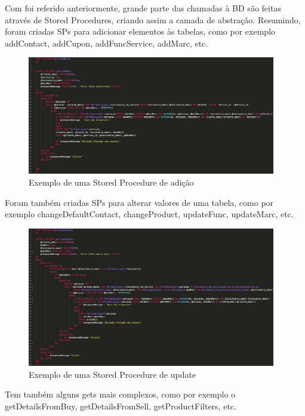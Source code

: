 \documentclass[10pt,portuguese]{article}
\begin{document}
\par Com foi referido anteriormente, grande parte das chamadas à BD são feitas através de Stored Procedures, criando assim a camada de abstração. Resumindo, foram criadas SPs para adicionar elementos às tabelas, como por exemplo addContact, addCupon, addFuncService, addMarc, etc.

\begin{figure}[!h]
    \centering
    \includegraphics[width=410]{images/addMarc.png}
    \caption{Exemplo de uma Stored Procedure de adição}
\end{figure}


\par Foram também criadas SPs para alterar valores de uma tabela, como por exemplo changeDefaultContact, changeProduct, updateFunc, updateMarc, etc.

\begin{figure}[!h]
    \centering
    \includegraphics[width=410]{images/updateMarc.png}
    \caption{Exemplo de uma Stored Procedure de update}
\end{figure}

\par Tem também alguns gets mais complexos, como por exemplo o getDetailsFromBuy, getDetailsFromSell, getProductFilters, etc.
\end{document}
